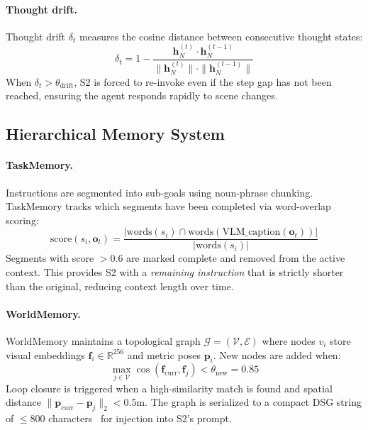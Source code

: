\documentclass[10pt,twocolumn,letterpaper]{article}
\begin{document}
\paragraph{Thought drift.}
Thought drift $\delta_t$ measures the cosine distance between consecutive thought states:
\begin{equation}
  \delta_t = 1 - \frac{\mathbf{h}_N^{(t)} \cdot \mathbf{h}_N^{(t-1)}}{\|\mathbf{h}_N^{(t)}\| \cdot \|\mathbf{h}_N^{(t-1)}\|}
\end{equation}
When $\delta_t > \theta_{\text{drift}}$, S2 is forced to re-invoke even if the step gap has not been reached, ensuring the agent responds rapidly to scene changes.

\subsection{Hierarchical Memory System}

\paragraph{TaskMemory.}
Instructions are segmented into sub-goals using noun-phrase chunking. TaskMemory tracks which segments have been completed via word-overlap scoring:
\begin{equation}
  \text{score}(s_i, \mathbf{o}_t) = \frac{|\text{words}(s_i) \cap \text{words}(\text{VLM\_caption}(\mathbf{o}_t))|}{|\text{words}(s_i)|}
\end{equation}
Segments with score $>0.6$ are marked complete and removed from the active context. This provides S2 with a \textit{remaining instruction} that is strictly shorter than the original, reducing context length over time.

\paragraph{WorldMemory.}
WorldMemory maintains a topological graph $\mathcal{G} = (\mathcal{V}, \mathcal{E})$ where nodes $v_i$ store visual embeddings $\mathbf{f}_i \in \mathbb{R}^{256}$ and metric poses $\mathbf{p}_i$. New nodes are added when:
\begin{equation}
  \max_{j \in \mathcal{V}} \cos(\mathbf{f}_\text{curr}, \mathbf{f}_j) < \theta_{\text{new}} = 0.85
\end{equation}
Loop closure is triggered when a high-similarity match is found and spatial distance $\|\mathbf{p}_\text{curr} - \mathbf{p}_j\|_2 < 0.5\text{m}$. The graph is serialized to a compact DSG string of $\le$800 characters~\cite{omnivln2025} for injection into S2's prompt.
\end{document}
